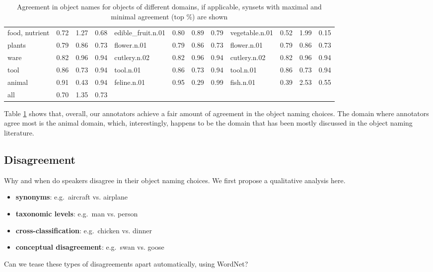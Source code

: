 \documentclass[11pt,a4paper]{article}
\begin{document}
\begin{table}
\begin{tabular}{llll|llll|llll}
                   food, nutrient &  0.72 &  1.27 &  0.68 &  edible\_fruit.n.01 &  0.80 &  0.89 &  0.79 &         vegetable.n.01 &  0.52 &  1.99 &  0.15 \\
         plants &  0.79 &  0.86 &  0.73 &        flower.n.01 &  0.79 &  0.86 &  0.73 &            flower.n.01 &  0.79 &  0.86 &  0.73 \\
                             ware &  0.82 &  0.96 &  0.94 &       cutlery.n.02 &  0.82 &  0.96 &  0.94 &           cutlery.n.02 &  0.82 &  0.96 &  0.94 \\
                             tool &  0.86 &  0.73 &  0.94 &          tool.n.01 &  0.86 &  0.73 &  0.94 &              tool.n.01 &  0.86 &  0.73 &  0.94 \\
                           animal &  0.91 &  0.43 &  0.94 &        feline.n.01 &  0.95 &  0.29 &  0.99 &              fish.n.01 &  0.39 &  2.53 &  0.55 \\
\bottomrule
 all &  0.70 &  1.35 &  0.73            \\

\bottomrule
\end{tabular}
\caption{Agreement in object names for objects of different domains, if applicable, synsets with maximal and minimal agreement (top \%) are shown }
\label{tab:agree}
\end{table}

Table \ref{tab:agree} shows that, overall, our annotators achieve a fair amount of agreement in the object naming choices. The domain where annotators agree most is the animal domain, which, interestingly, happens to be the domain that has been mostly discussed in the object naming literature. 


\subsection{Disagreement}

Why and when do speakers disagree in their object naming choices. We first propose a qualitative analysis here.


\begin{itemize}
\item \textbf{synonyms}: e.g.\ aircraft vs. airplane 
\item \textbf{taxonomic levels}: e.g.\ man vs. person
\item \textbf{cross-classification}: e.g.\ chicken vs. dinner
\item \textbf{conceptual disagreement}: e.g.\ swan vs. goose
\end{itemize}

Can we tease these types of disagreements apart automatically, using WordNet?
\end{document}
